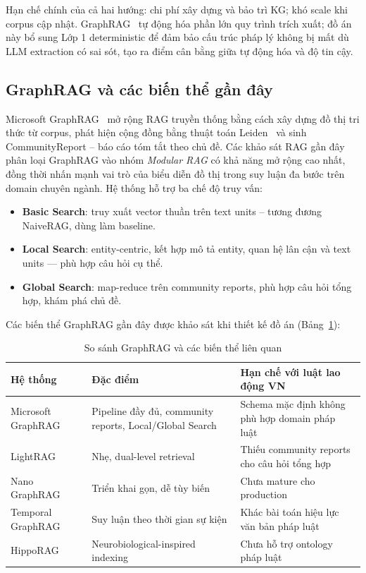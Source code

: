 \documentclass[../DoAn.tex]{subfiles}
\begin{document}
Hạn chế chính của cả hai hướng: chi phí xây dựng và bảo trì KG; khó scale khi corpus cập nhật. GraphRAG~\cite{graphrag2024} tự động hóa phần lớn quy trình trích xuất; đồ án này bổ sung Lớp 1 deterministic để đảm bảo cấu trúc pháp lý không bị mất dù LLM extraction có sai sót, tạo ra điểm cân bằng giữa tự động hóa và độ tin cậy.

\subsection{GraphRAG và các biến thể gần đây}
\label{subsection:2.2.3}

Microsoft GraphRAG~\cite{graphrag2024} mở rộng RAG truyền thống bằng cách xây dựng đồ thị tri thức từ corpus, phát hiện cộng đồng bằng thuật toán Leiden~\cite{traag2019leiden} và sinh \gls{CommunityReport} -- báo cáo tóm tắt theo chủ đề. Các khảo sát RAG gần đây~\cite{gao2024ragsurvey,zhang2025graphragsurvey} phân loại GraphRAG vào nhóm \emph{Modular RAG} có khả năng mở rộng cao nhất, đồng thời nhấn mạnh vai trò của biểu diễn đồ thị trong suy luận đa bước trên domain chuyên ngành. Hệ thống hỗ trợ ba chế độ truy vấn:

\begin{itemize}[nosep, leftmargin=*]
    \item \textbf{Basic Search}: truy xuất vector thuần trên text units -- tương đương \gls{NaiveRAG}, dùng làm baseline.
    \item \textbf{Local Search}: entity-centric, kết hợp mô tả entity, quan hệ lân cận và text units --- phù hợp câu hỏi cụ thể.
    \item \textbf{Global Search}: map-reduce trên community reports, phù hợp câu hỏi tổng hợp, khám phá chủ đề.
\end{itemize}

Các biến thể GraphRAG gần đây được khảo sát khi thiết kế đồ án (Bảng~\ref{table:graphrag_variants}):

\begin{table}[H]
\centering
\caption{So sánh GraphRAG và các biến thể liên quan}
\label{table:graphrag_variants}
\small
\begin{tabular}{|p{2.8cm}|p{4.5cm}|p{4.5cm}|}
\hline
\textbf{Hệ thống} & \textbf{Đặc điểm} & \textbf{Hạn chế với luật lao động VN} \\
\hline
Microsoft GraphRAG~\cite{graphrag2024} & Pipeline đầy đủ, community reports, Local/Global Search & Schema mặc định không phù hợp domain pháp luật \\
LightRAG~\cite{guo2024lightrag} & Nhẹ, dual-level retrieval & Thiếu community reports cho câu hỏi tổng hợp \\
Nano GraphRAG & Triển khai gọn, dễ tùy biến & Chưa mature cho production \\
Temporal GraphRAG & Suy luận theo thời gian sự kiện & Khác bài toán hiệu lực văn bản pháp luật \\
HippoRAG~\cite{hipporag2024} & Neurobiological-inspired indexing & Chưa hỗ trợ ontology pháp luật \\
\hline
\end{tabular}
\end{table}
\end{document}
